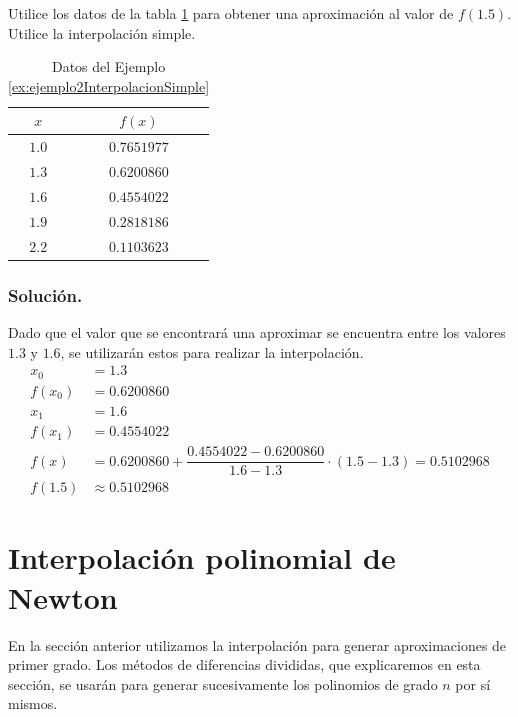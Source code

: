 \begin{example}{\rm 
Utilice los datos de la tabla \ref{table:ejemplo2InterpolacionSimple} para obtener una aproximación al valor de $f(1.5)$. 
Utilice la interpolación simple.
	
	\begin{table}[H]
		\centering
      \begin{tabular}{|c|c|}
				\hline 
				\rowcolor[gray]{0.9} $x$ & $f(x)$\\ \hline
					$1.0$ & $0.7651977$ \\
					$1.3$ & $0.6200860$ \\
					$1.6$ & $0.4554022$ \\
					$1.9$ & $0.2818186$ \\
					$2.2$ & $0.1103623$ \\
				\hline
      	\end{tabular}
      	\caption{Datos del Ejemplo \ref{ex:ejemplo2InterpolacionSimple}}
      	\label{table:ejemplo2InterpolacionSimple}
	\end{table}	
	
	\subsubsection*{Solución.} 
	Dado que el valor que se encontrará una aproximar se encuentra entre los valores $1.3$ y $1.6$, se utilizarán estos para realizar 
	la interpolación.
	\begin{align*}
		x_0 &= 1.3 \\
		f(x_0) &= 0.6200860\\
		x_1 &= 1.6 \\
		f(x_1) &= 0.4554022 \\
		f(x) &= 0.6200860 + \dfrac{0.4554022-0.6200860}{1.6-1.3}\cdot (1.5-1.3) = 0.5102968\\
		f(1.5) &\approx 0.5102968
	\end{align*}
	
	\label{ex:ejemplo2InterpolacionSimple}
}\end{example}

\section{Interpolación polinomial de Newton}
En la sección anterior utilizamos la interpolación para generar aproximaciones de primer grado. Los métodos de diferencias 
divididas, que explicaremos en esta sección, se usarán para generar sucesivamente los polinomios de grado $n$ por sí mismos.

